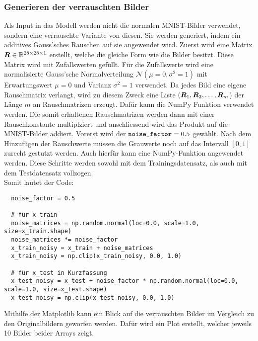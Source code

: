 \subsubsection{Generieren der verrauschten Bilder}\label{sec:generierung_verrauschte_bilder}
Als Input in das Modell werden nicht die normalen MNIST-Bilder verwendet, sondern
eine verrauschte Variante von diesen. Sie werden generiert, indem ein
additives Gauss'sches Rauschen auf sie angewendet wird.
\para{}
Zuerst wird eine Matrix $\bm{R} \in \mathbb{R}^{28 \times 28 \times 1}$ erstellt, welche die gleiche Form wie die
Bilder besitzt. Diese Matrix wird mit Zufallswerten gefüllt. Für die
Zufallswerte wird eine normalisierte Gauss'sche Normalverteilung
$\mathcal{N}(\mu = 0, \sigma^2 = 1)$ mit Erwartungswert $\mu = 0$ und Varianz
$\sigma^2 = 1$ verwendet. Da jedes Bild eine eigene Rauschmatrix verlangt,
wird zu diesem Zweck eine Liste $(\bm{R}_1,\bm{R}_2,\ldots,\bm{R}_m$) der Länge $m$ an
Rauschmatrizen erzeugt. Dafür kann die NumPy Funktion
 verwendet werden.
Die somit erhaltenen Rauschmatrizen werden dann mit einer Rauschkonstante
 multiplziert und anschliessend wird das Produkt auf die
MNIST-Bilder addiert. Vorerst wird der $\texttt{noise\_factor} = 0.5$ gewählt.
Nach dem Hinzufügen der Rauschwerte müssen die Grauwerte noch auf das Intervall
$[0,1]$ zurecht gestutzt werden. Auch hierfür kann eine NumPy-Funktion
 angewendet werden. Diese Schritte werden sowohl mit dem
Trainingsdatensatz, als auch mit dem Testdatensatz vollzogen. \\
Somit lautet der Code:
\begin{verbatim}
  noise_factor = 0.5

  # für x_train
  noise_matrices = np.random.normal(loc=0.0, scale=1.0, size=x_train.shape)
  noise_matrices *= noise_factor
  x_train_noisy = x_train + noise_matrices
  x_train_noisy = np.clip(x_train_noisy, 0.0, 1.0)

  # für x_test in Kurzfassung
  x_test_noisy = x_test + noise_factor * np.random.normal(loc=0.0, scale=1.0, size=x_test.shape)
  x_test_noisy = np.clip(x_test_noisy, 0.0, 1.0)
\end{verbatim}
\para{}
Mithilfe der Matplotlib kann ein Blick auf die verrauschten Bilder im Vergleich zu
den Originalbildern geworfen werden.
Dafür wird ein Plot erstellt, welcher jeweils 10 Bilder beider Arrays zeigt.
